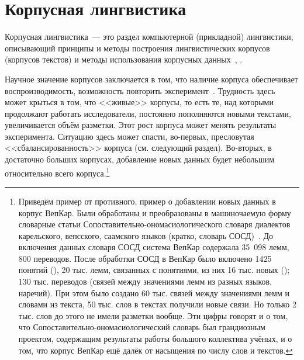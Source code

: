 \section{Корпусная лингвистика} \label{sect_review_corpus_linguistics}

Корпусная лингвистика~--- это раздел компьютерной (прикладной) лингвистики, 
описывающий принципы и методы 
построения лингвистических корпусов (корпусов текстов)
и методы использования корпусных данных~\cite[с.~3]{Zakharov2005}, \cite[с.~407]{Kibrik2019}.

Научное значение корпусов заключается в том, что наличие корпуса обеспечивает воспроизводимость, 
возможность повторить эксперимент~\cite[с.~409]{Kibrik2019}. 
Трудность здесь может крыться в том, что <<живые>> корпусы, 
то есть те, над которыми продолжают работать исследователи, 
постоянно пополняются новыми текстами, увеличивается объём разметки. 
Этот рост корпуса может менять результаты эксперимента. 
Ситуацию здесь может спасти, во-первых, пресловутая <<сбалансированность>> корпуса (см. следующий раздел). 
Во-вторых, в достаточно больших корпусах, добавление новых данных будет небольшим 
относительно всего корпуса.\footnote{%
    Приведём пример от противного, пример о добавлении новых данных в корпус ВепКар. 
    Были обработаны и преобразованы в машиночаемую форму словарные статьи 
    Сопоставительно-ономасиологического словаря диалектов карельского, вепсского, саамского языков (кратко, словарь СОСД)~\cite{SOSD2007}. 
    До включения данных словаря СОСД система ВепКар содержала 35~098 лемм, 800 переводов.
    После обработки СОСД в ВепКар было включено 1425 понятий 
        (), 
    20 тыс. лемм, связанных с понятиями, из них 16 тыс. новых (); 
    130 тыс. переводов (связей между значениями лемм из разных языков, наречий). 
    При этом было создано 60 тыс. связей между значениями лемм и словами из текста, 
    50 тыс. слов в текстах получили новые связи. Но только 2 тыс. слов до этого не имели разметки вообще.
    Эти цифры говорят и о том, что Сопоставительно-ономасиологический словарь был грандиозным проектом, 
    содержащим результаты работы большого коллектива учёных, и о том,
    что корпус ВепКар ещё далёк от насыщения по числу слов и текстов.
}



